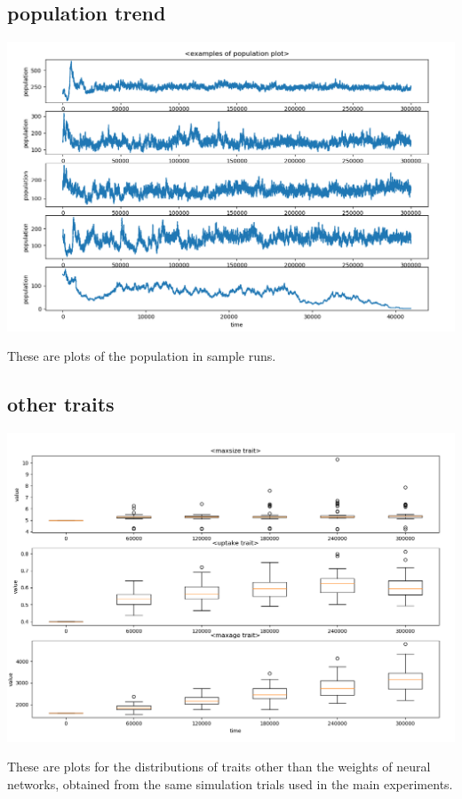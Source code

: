 \documentclass{amsart}
\theoremstyle{definition}
\theoremstyle{remark}
\numberwithin{equation}{section}
\begin{document}
\subsection{population trend}
\begin{center}
\includegraphics[scale=0.3]{images/population.png}
\end{center}
These are plots of the population in sample runs. 

\subsection{other traits}
\begin{center}
\includegraphics[scale=0.3]{images/traits.png}
\end{center}
These are plots for the distributions of traits other than the weights of neural networks, obtained from the same simulation trials used in the main experiments. 
\end{document}
